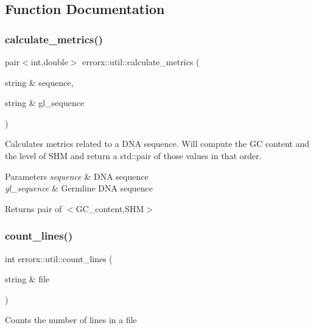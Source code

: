 \subsection{Function Documentation}
\mbox{\label{util_8hh_file_aa88ff24aa9d13330c57cc66beb4ca714}} 
\subsubsection{\texorpdfstring{calculate\+\_\+metrics()}{calculate\_metrics()}}
{\footnotesize\ttfamily pair$<$int,double$>$ errorx\+::util\+::calculate\+\_\+metrics (\begin{DoxyParamCaption}\item[{string \&}]{sequence,  }\item[{string \&}]{gl\+\_\+sequence }\end{DoxyParamCaption})}

Calculates metrics related to a D\+NA sequence. Will compute the GC content and the level of S\+HM and return a std\+::pair of those values in that order.


\begin{DoxyParams}{Parameters}
{\em sequence} & D\+NA sequence \\
\hline
{\em gl\+\_\+sequence} & Germline D\+NA sequence\\
\hline
\end{DoxyParams}
\begin{DoxyReturn}{Returns}
pair of $<$G\+C\+\_\+content,S\+HM$>$ 
\end{DoxyReturn}
\mbox{\label{util_8hh_file_a58faf4ea61e447be2b4d380af4201e46}} 
\subsubsection{\texorpdfstring{count\+\_\+lines()}{count\_lines()}}
{\footnotesize\ttfamily int errorx\+::util\+::count\+\_\+lines (\begin{DoxyParamCaption}\item[{string \&}]{file }\end{DoxyParamCaption})}

Counts the number of lines in a file


